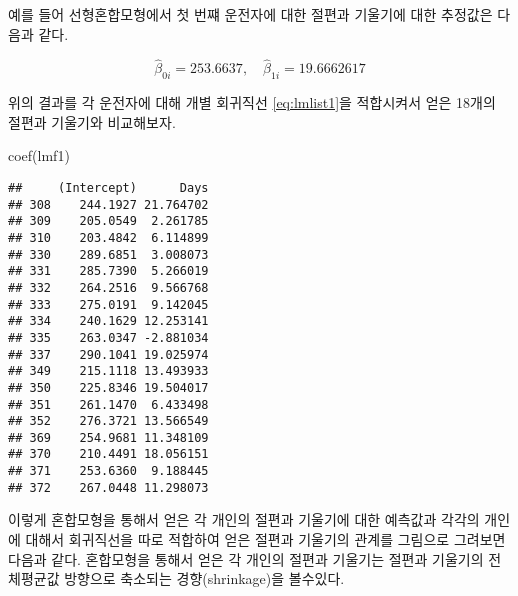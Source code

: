 \documentclass[
]{book}
\newenvironment{Shaded}{\begin{snugshade}}{\end{snugshade}}
\newcommand{\FunctionTok}[1]{\textcolor[rgb]{0.00,0.00,0.00}{#1}}
\newcommand{\NormalTok}[1]{#1}
\begin{document}
예를 들어 선형혼합모형에서 첫 번쨰 운전자에 대한 절편과 기울기에 대한 추정값은 다음과 같다.

\[ {\hat \beta}_{0i} =  253.6637,  \quad {\hat \beta}_{1i} = 19.6662617 \]

위의 결과를 각 운전자에 대해 개별 회귀직선 \eqref{eq:lmlist1}을 적합시켜서 얻은 18개의 절편과 기울기와 비교해보자.

\begin{Shaded}
\begin{Highlighting}[]
\FunctionTok{coef}\NormalTok{(lmf1)}
\end{Highlighting}
\end{Shaded}

\begin{verbatim}
##     (Intercept)      Days
## 308    244.1927 21.764702
## 309    205.0549  2.261785
## 310    203.4842  6.114899
## 330    289.6851  3.008073
## 331    285.7390  5.266019
## 332    264.2516  9.566768
## 333    275.0191  9.142045
## 334    240.1629 12.253141
## 335    263.0347 -2.881034
## 337    290.1041 19.025974
## 349    215.1118 13.493933
## 350    225.8346 19.504017
## 351    261.1470  6.433498
## 352    276.3721 13.566549
## 369    254.9681 11.348109
## 370    210.4491 18.056151
## 371    253.6360  9.188445
## 372    267.0448 11.298073
\end{verbatim}

이렇게 혼합모형을 통해서 얻은 각 개인의 절편과 기울기에 대한 예측값과 각각의 개인에 대해서 회귀직선을 따로 적합하여 얻은
절편과 기울기의 관계를 그림으로 그려보면 다음과 같다. 혼합모형을 통해서 얻은 각 개인의 절편과 기울기는 절편과 기울기의 전체평균값 방향으로 축소되는 경향(shrinkage)을 볼수있다.
\end{document}
